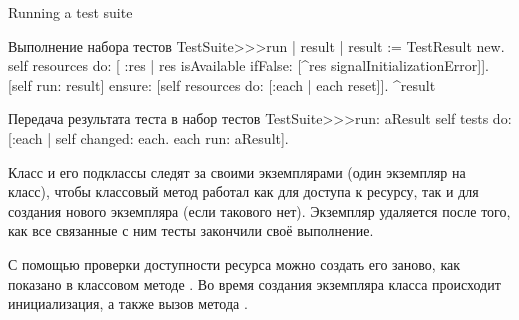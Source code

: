 \documentclass[a4paper,10pt,twoside]{book}
\begin{document}
\begin{method}[testsuiterun]{Running a test suite}
\begin{method}[testsuiterun]{Выполнение набора тестов}
TestSuite>>>run
	| result |
 	result := TestResult new.
	self resources do: [ :res |
		res isAvailable ifFalse: [^res signalInitializationError]].
	[self run: result] ensure: [self resources do: [:each | each reset]].
	^result
\end{method}

\begin{method}[testsuiterun:]{Передача результата теста в набор тестов}
TestSuite>>>run: aResult
	self tests do: [:each | 
		self changed: each.
		each run: aResult].
\end{method}

Класс  и его подклассы следят за своими экземплярами (один экземпляр на класс), чтобы классовый метод  работал как для доступа к ресурсу, так и для создания нового экземпляра (если такового нет).
Экземпляр удаляется после того, как все связанные с ним тесты закончили своё выполнение.

С помощью проверки доступности ресурса можно создать его заново, как показано в классовом методе .
Во время создания экземпляра класса  происходит инициализация, а также вызов метода .



\end{method}
\end{document}
